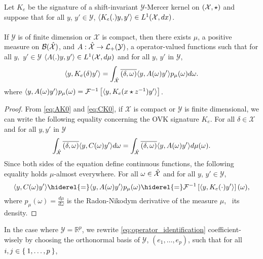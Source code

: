 \begin{proposition}
\label{pr:spectral}
Let $K_e$ be the signature of a shift-invariant $\mathcal{Y}$-Mercer kernel on $(\mathcal{X}, \star)$ and suppose that for all $y$, $y' \in\mathcal{Y}$, $\langle K_e(.)y,y'\rangle\in L^1(\mathcal{X},dx)$. 
\paragraph{}
If $\mathcal{Y}$ is of finite dimension or $\mathcal{X}$ is compact, then there exists $\mu$, a positive measure on $\mathcal{B}(\mathcal{\hat{\mathcal{X}}})$, and $A:\hat{\mathcal{X}}\to \mathcal{L}_+(\mathcal{Y})$, a operator-valued functions such that for all $y,$ $y'\in\mathcal{Y}$ $\langle A(.)y,y'\rangle\in L^1(\mathcal{X},d\mu)$ and for all $y$, $y'$ in $\mathcal{Y}$,
\begin{dmath*}
\inner{y, K_e(\delta)y'}=\int_{\dual{\mathcal{X}}}\conj{\pairing{\delta, \omega}}\inner{y, A(\omega)y'}p_{\mu}(\omega)d\omega.
\end{dmath*}
where $\langle y, A(\omega)y'\rangle p_{\mu}(\omega) = \mathcal{F}^{-1}\left[\langle y, K_e(x\star {z}^{-1})y'\rangle\right]$.
\end{proposition}
\begin{proof}
From \cref{eq:AK0} and \cref{eq:CK0}, if $\mathcal{X}$ is compact or $\mathcal{Y}$ is finite dimensional, we can write the following equality concerning the \acs{OVK} signature $K_e$. For all $\delta \in \mathcal{X}$ and for all $y, y'$ in $\mathcal{Y}$
\begin{dmath*}
\int_{\dual{\mathcal{X}}}\conj{\pairing{\delta, \omega}}\inner{y, C(\omega)y'}d\omega=\int_{\dual{\mathcal{X}}}\conj{\pairing{\delta, \omega}}\inner{y, A(\omega)y'}d\mu(\omega).
\end{dmath*} %
Since both sides of the equation define continuous functions, the following equality holds $\mu$-almost everywhere. For all $\omega \in \hat{\mathcal{X}}$ and for all $y$, $y'\in\mathcal{Y}$,
\begin{dmath}
\label{eq:operator_identification}
\inner{y, C(\omega)y'}\hiderel{=}\inner{y, A(\omega)y'}p_{\mu}(\omega)\hiderel{=}\IFT{\inner{y, K_e(\cdot)y'}}(\omega),
\end{dmath}
where $p_{\mu}(\omega)=\frac{d\mu}{d\omega}$ is the Radon-Nikodym derivative of the measure $\mu$, \ie~its density. 
\end{proof}
In the case where $\mathcal{Y}=\mathbb{R}^p$, we rewrite \cref{eq:operator_identification} coefficient-wisely by choosing the orthonormal basis of $\mathcal{Y}$, $(e_1,\ldots, e_p)$, such that for all $ i,j\in \Set{1, \ldots, p}$,
